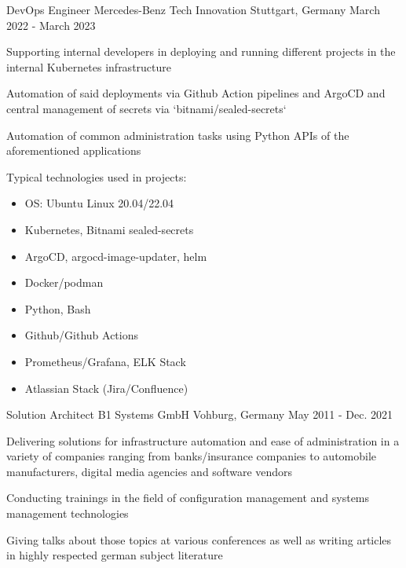 \begin{cventries}
  \cventry
    {DevOps Engineer} %
    {Mercedes-Benz Tech Innovation} %
    {Stuttgart, Germany} %
    {March 2022 - March 2023} %
    {
      \begin{cvitems} %
        \item Supporting internal developers in deploying and running different projects in the
          internal Kubernetes infrastructure
        \item Automation of said deployments via Github Action pipelines and ArgoCD and central
          management of secrets via `bitnami/sealed-secrets`
        \item Automation of common administration tasks using Python APIs of the aforementioned
          applications
        \item Typical technologies used in projects:
          \begin{itemize}
            \item OS: Ubuntu Linux 20.04/22.04
            \item Kubernetes, Bitnami sealed-secrets
            \item ArgoCD, argocd-image-updater, helm
            \item Docker/podman
            \item Python, Bash
            \item Github/Github Actions
            \item Prometheus/Grafana, ELK Stack
            \item Atlassian Stack (Jira/Confluence)
          \end{itemize}
      \end{cvitems}
    }
  \cventry
    {Solution Architect} %
    {B1 Systems GmbH} %
    {Vohburg, Germany} %
    {May 2011 - Dec. 2021} %
    {
      \begin{cvitems} %
        \item Delivering solutions for infrastructure automation and ease of administration in a variety of companies ranging from banks/insurance companies to automobile manufacturers, digital media agencies and software vendors
        \item Conducting trainings in the field of configuration management and systems management technologies
        \item Giving talks about those topics at various conferences as well as writing articles in highly respected german subject literature

\end{cvitems}}
\end{cventries}
